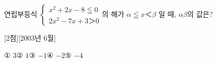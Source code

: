  연립부등식 $\begin{cases}
x^{2}+2x-8≦0 \\
2x^{2}-7x+3＞0
\end{cases}
$의 해가 $\alpha ≦x ＜\beta 
$ 일 때, $\alpha\beta 
$의 값은? 

[2점][2003년 6월]

① $3
$② $1
$③ $-1
$④ $-2
$⑤ $-4
$

\vfill{}
\rule{0pt}{1mm}